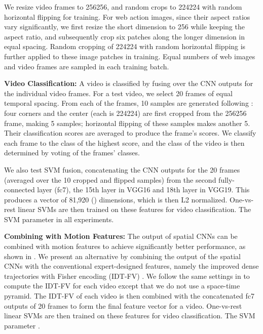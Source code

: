 \documentclass[10pt,twocolumn,letterpaper]{article}
\begin{document}
We resize video frames to 256256, and random crops to 224224 with random horizontal flipping for training. For web action images, since their aspect ratios vary significantly, we first resize the short dimension to 256 while keeping the aspect ratio, and subsequently crop six  patches along the longer dimension in equal spacing. Random cropping of 224224 with random horizontal flipping is further applied to these image patches in training. Equal numbers of web images and video frames are sampled in each training batch.

\vspace{0.1in}
\noindent \textbf{Video Classification:} 
A video is classified by fusing over the CNN outputs for the individual video frames.  For a test video, we select 20 frames of equal temporal spacing. From each of the frames, 10 samples are generated following \cite{krizhevsky2012imagenet}: four corners and the center (each is 224224) are first cropped from the 256256 frame, making 5 samples;  horizontal flipping of these samples makes another 5. Their classification scores are averaged to produce the frame's scores. We classify each frame to the class of the highest score, and the class of the video is then determined by voting of the frames' classes.  

We also test SVM fusion, concatenating the CNN outputs for the 20 frames (averaged over the 10 cropped and flipped samples) from the second fully-connected layer (fc7), \ie the 15th layer in VGG16 and 18th layer in VGG19. This produces a vector of 81,920 () dimensions, which is then L2 normalized. One-vs-rest linear SVMs are then trained on these features for video classification. The SVM parameter  in all experiments.

\vspace{0.1in}
\noindent \textbf{Combining with Motion Features:} The output of spatial CNNs can be combined with motion features to achieve significantly better performance, as shown in \cite{simonyan2014two}. 
We present an alternative by combining the output of the spatial CNNs with the conventional expert-designed features, namely the improved dense trajectories with Fisher encoding (IDT-FV) \cite{wang2013lear}. We follow the same settings in \cite{wang2013lear} to compute the IDT-FV for each video except that we do not use a space-time pyramid. The IDT-FV of each video is then combined with the concatenated fc7 outputs of 20 frames to form the final feature vector for a video. One-vs-rest linear SVMs are then trained on these features for video classification. The SVM parameter .
\end{document}
